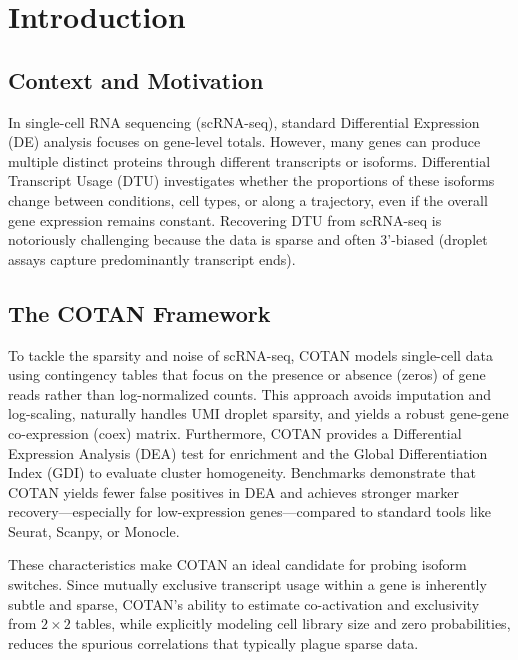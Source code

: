 \chapter{Introduction}

\section{Context and Motivation}
In single-cell RNA sequencing (scRNA-seq), standard Differential Expression (DE) analysis focuses on gene-level totals. However, many genes can produce multiple distinct proteins through different transcripts or isoforms. Differential Transcript Usage (DTU) investigates whether the proportions of these isoforms change between conditions, cell types, or along a trajectory, even if the overall gene expression remains constant. Recovering DTU from scRNA-seq is notoriously challenging because the data is sparse and often 3'-biased (droplet assays capture predominantly transcript ends).

\section{The COTAN Framework}
To tackle the sparsity and noise of scRNA-seq, COTAN \cite{galfre2026gene, galfre2021cotan} models single-cell data using contingency tables that focus on the presence or absence (zeros) of gene reads rather than log-normalized counts. This approach avoids imputation and log-scaling, naturally handles UMI droplet sparsity, and yields a robust gene-gene co-expression (coex) matrix. Furthermore, COTAN provides a Differential Expression Analysis (DEA) test for enrichment and the Global Differentiation Index (GDI) to evaluate cluster homogeneity. Benchmarks demonstrate that COTAN yields fewer false positives in DEA and achieves stronger marker recovery—especially for low-expression genes—compared to standard tools like Seurat, Scanpy, or Monocle. 

These characteristics make COTAN an ideal candidate for probing isoform switches. Since mutually exclusive transcript usage within a gene is inherently subtle and sparse, COTAN's ability to estimate co-activation and exclusivity from $2 \times 2$ tables, while explicitly modeling cell library size and zero probabilities, reduces the spurious correlations that typically plague sparse data.

